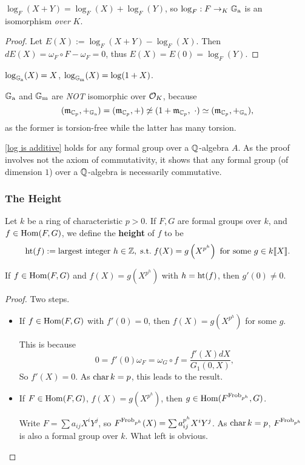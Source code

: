 \begin{proposition}\label{log is additive}
    $\log_F(X + Y) = \log_F(X) + \log_F(Y)$, so $\log_F : F\to_{K} {\mathbb{G}_{\mathrm{a}}}$ is an isomorphism \textit{over} $K$.
\end{proposition}
\begin{proof}
    Let $E(X) := \log_F(X + Y) - \log_F(X)$.
    Then $dE(X) = \omega_F\circ F - \omega_F = 0$,
    thus $E(X) = E(0) = \log_F(Y)$.
\end{proof}
\begin{example}
    $\log_{{\mathbb{G}_{\mathrm{a}}}}(X) = X$, $\log_{{\mathbb{G}_{\mathrm{m}}}}(X) = \log(1 + X)$.
\end{example}
\begin{example}
    ${\mathbb{G}_{\mathrm{a}}}$ and ${\mathbb{G}_{\mathrm{m}}}$ are \textit{NOT} isomorphic over $\mathcal{O}_K$, because \[(\mathfrak{m}_{\mathbb{C}_p}, +_{{\mathbb{G}_{\mathrm{a}}}})
     = (\mathfrak{m}_{\mathbb{C}_p}, +)
     \not\simeq (1 + \mathfrak{m}_{\mathbb{C}_p}, \ \cdot)
     \simeq (\mathfrak{m}_{\mathbb{C}_p}, +_{{\mathbb{G}_{\mathrm{a}}}}),\]
    as the former is torsion-free while the latter has many torsion.
\end{example}
\begin{remark}
    \cref{log is additive} holds for any formal group over a $\mathbb{Q}$-algebra $A$.
    As the proof involves not the axiom of commutativity,
    it shows that any formal group (of dimension $1$) over a $\mathbb{Q}$-algebra is necessarily commutative.
\end{remark}

\subsubsection{The Height}
Let $k$ be a ring of characteristic $p >0$.
If $F, G$ are formal groups over $k$,
and $f\in\operatorname{Hom}(F, G)$, we define the \textbf{height} of $f$ to be
\[\operatorname{ht}(f) := \text{largest integer } h\in\mathbb{Z} ,\;\mathrm{s.t.}\; f(X) = g\left( X^{p^h} \right) \text{ for some } g\in k\llbracket X \rrbracket.\]
\begin{proposition}
    If $f\in \operatorname{Hom}(F, G)$ and $f(X) = g\left( X^{p^h} \right)$ with $h = \operatorname{ht}(f)$,
    then $g'(0)\ne 0$.
\end{proposition}
\begin{proof}
    Two steps.
    \begin{itemize}
        \item If $f\in \operatorname{Hom}(F, G)$ with $f'(0) = 0$,
        then $f(X) = g\left( X^{p^h} \right)$ for some $g$.

        This is because \[0 = f'(0)\omega_F = \omega_G\circ f = \frac{f'(X)dX }{G_1(0, X )},\]
        So $f'(X) = 0$. As $\operatorname{char} k = p$,
        this leads to the result.
        \item If $F\in\operatorname{Hom}(F, G)$, $f(X) = g\left( X^{p^h} \right)$, then $g\in\operatorname{Hom}(F^{\operatorname{Frob}_{p^h}}, G)$.

        Write $F = \sum a_{ij}X^iY^j$, so $F^{\operatorname{Frob}_{p^h}}(X) = \sum a_{ij}^{p^h}X^iY^j$. As $\operatorname{char} k = p$, $F^{\operatorname{Frob}_{p^h}}$ is also a formal group over $k$.
        What left is obvious.
    \end{itemize}
\end{proof}


